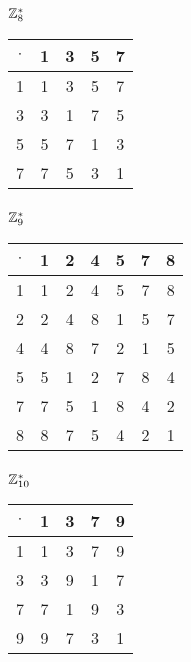 \subsubsection{$\mathbb{Z}_{8}^*$}
\begin{tabular}{|c|c|c|c|c|}
\hline $\cdot$  & 1 & 3 & 5 & 7\\
\hline 1 & 1 & 3 & 5 & 7\\
\hline 3 & 3 & 1 & 7 & 5\\
\hline 5 & 5 & 7 & 1 & 3\\
\hline 7 & 7 & 5 & 3 & 1\\
\hline
\end{tabular}


\subsubsection{$\mathbb{Z}_{9}^*$}
\begin{tabular}{|c|c|c|c|c|c|c|}
\hline $\cdot$  & 1 & 2 & 4 & 5 & 7 & 8\\
\hline 1 & 1 & 2 & 4 & 5 & 7 & 8\\
\hline 2 & 2 & 4 & 8 & 1 & 5 & 7\\
\hline 4 & 4 & 8 & 7 & 2 & 1 & 5\\
\hline 5 & 5 & 1 & 2 & 7 & 8 & 4\\
\hline 7 & 7 & 5 & 1 & 8 & 4 & 2\\
\hline 8 & 8 & 7 & 5 & 4 & 2 & 1\\
\hline
\end{tabular}


\subsubsection{$\mathbb{Z}_{10}^*$}
\begin{tabular}{|c|c|c|c|c|}
\hline $\cdot$  & 1 & 3 & 7 & 9\\
\hline 1 & 1 & 3 & 7 & 9\\
\hline 3 & 3 & 9 & 1 & 7\\
\hline 7 & 7 & 1 & 9 & 3\\
\hline 9 & 9 & 7 & 3 & 1\\
\hline
\end{tabular}


